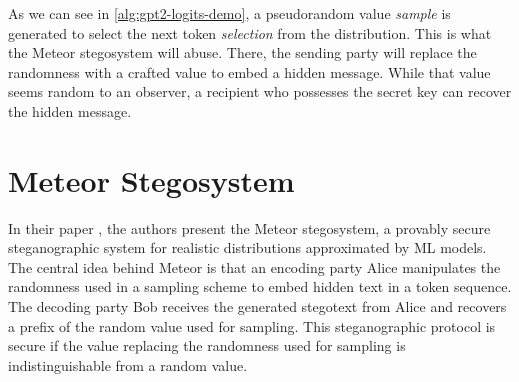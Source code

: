 As we can see in \autoref{alg:gpt2-logits-demo}, a pseudorandom value \emph{sample} is generated to select the next token \emph{selection} from the distribution.
This is what the Meteor stegosystem will abuse.
There, the sending party will replace the randomness with a crafted value to embed a hidden message.
While that value seems random to an observer, a recipient who possesses the secret key can recover the hidden message.

\newpage





\newpage

\section{Meteor Stegosystem}
\label{sec:meteor}
In their paper \cite{Meteor2021}, the authors present the Meteor stegosystem, a provably secure steganographic system for realistic distributions approximated by ML models.
The central idea behind Meteor is that an encoding party Alice manipulates the randomness used in a sampling scheme to embed hidden text in a token sequence.
The decoding party Bob receives the generated stegotext from Alice and recovers a prefix of the random value used for sampling.
This steganographic protocol is secure if the value replacing the randomness used for sampling is indistinguishable from a random value.

